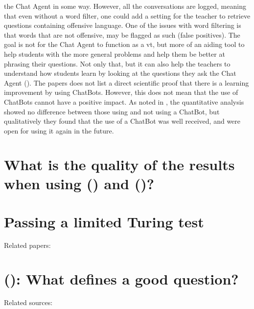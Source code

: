the Chat Agent in some way. However, all the conversations are logged, meaning that even without a word filter, one could add a setting for the teacher to retrieve questions 
containing offensive language. One of the issues with word filtering is that words that are not offensive, may be flagged as such (false positives). 
\vspace{0.5em}\newline
The goal is not for the Chat Agent to function as a \gls{vt}, but more of an aiding tool to help students with the more general problems and help them be better at phrasing 
their questions. Not only that, but it can also help the teachers to understand how students learn by looking at the questions they ask the Chat Agent (\citet{Knill2004,Rossi2011}). 
The papers does not list a direct scientific proof that there is a learning improvement by using ChatBots. However, this does not mean that the use of ChatBots cannot have a 
positive impact. As noted in \citet{Kowalski2013}, the quantitative analysis showed no difference between those using and not using a ChatBot, but qualitatively they found that 
the use of a ChatBot was well received, and were open for using it again in the future.


\section{What is the quality of the results when using  () and  ()?}
\label{chapter3:quality_results_hmm_bn}


\section{Passing a limited Turing test}
\label{chapter3:turing_test}

Related papers: \cite{Harnad2000,Livingstone2006,Turing1998}

\section{ (): What defines a good question?}
\label{chapter3:define_good_question}

Related sources: \cite{Stackoverflow.com2015,CommunityWiki2015,Lezina2013,Stackoverflow.com2015a,Stackoverflow.com2015b,Stackoverflow.com2015c,Treude2011}






